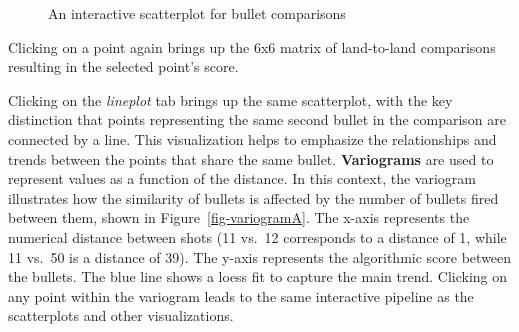 \documentclass[
  number,
  preprint,
  5p,
  twocolumn]{elsarticle}
\begin{document}
\begin{figure}


\caption{\label{fig-scatterplot}An interactive scatterplot for bullet
comparisons}

\end{figure}%

Clicking on a point again brings up the 6x6 matrix of land-to-land
comparisons resulting in the selected point's score.

Clicking on the \emph{lineplot} tab brings up the same scatterplot, with
the key distinction that points representing the same second bullet in
the comparison are connected by a line. This visualization helps to
emphasize the relationships and trends between the points that share the
same bullet. \hfill\newline \textbf{Variograms} are used to represent
values as a function of the distance. In this context, the variogram
illustrates how the similarity of bullets is affected by the number of
bullets fired between them, shown in Figure~\ref{fig-variogramA}. The
x-axis represents the numerical distance between shots (11 vs.~12
corresponds to a distance of 1, while 11 vs.~50 is a distance of 39).
The y-axis represents the algorithmic score between the bullets. The
blue line shows a loess fit to capture the main trend. Clicking on any
point within the variogram leads to the same interactive pipeline as the
scatterplots and other visualizations.
\end{document}
